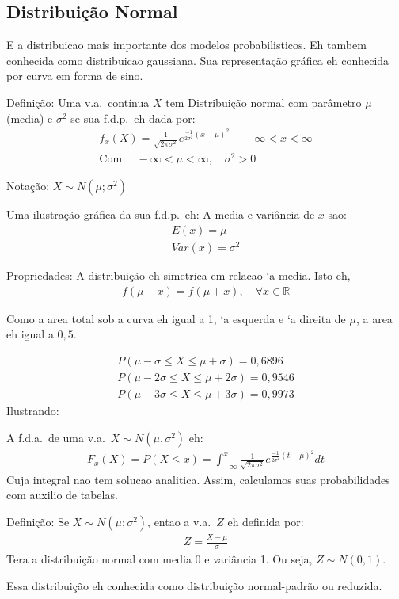 \subsection{Distribuição Normal}
E a distribuicao mais importante dos modelos probabilisticos. 
Eh tambem conhecida como distribuicao gaussiana. Sua representação 
gráfica eh conhecida por curva em forma de sino.
\begin{description}
  \item {Definição:}  Uma v.a.\ contínua $X$ tem Distribuição normal com parâmetro $\mu$ (media) e 
    $\sigma^2$ se sua f.d.p.\ eh dada por:
    \begin{align}
      f_{x} (X)= \frac{1}{\sqrt{2\pi \sigma^2}} e^{\frac{-1}{2\sigma^2} \left( x-\mu \right)^2} \quad -\infty<x<\infty \\
      \text{Com } \quad -\infty < \mu < \infty, \quad \sigma^2>0
    \end{align}
  \item {Notação:} $X \sim N(\mu ; \sigma^2)$

Uma ilustração gráfica da sua f.d.p.\ eh:
A media e variância de $x$ sao:
\begin{align*}
E(x) =\mu \\
Var(x)=\sigma^2
\end{align*}
\item {Propriedades:}
A distribuição eh simetrica em relacao `a media. Isto eh,
\begin{align}
  f(\mu - x) = f(\mu+x), \quad \forall x \in \mathbb{R}
\end{align}
\item Como a area total sob a curva eh igual a 1, `a esquerda e `a direita de $\mu$, 
  a area eh igual a $0,5$.
\item 
  \begin{align*}
    P(\mu -\sigma \leq X \leq \mu+\sigma)= 0,6896\\
    P(\mu -2\sigma \leq X \leq \mu+2\sigma)= 0,9546\\
    P(\mu -3\sigma \leq X \leq \mu+3\sigma)= 0,9973
  \end{align*}
Ilustrando:

A f.d.a.\ de uma v.a.\ $X \sim N(\mu,\sigma^2)$ eh:
\begin{align*}
  F_{x} (X)= P(X \leq x)= \int^{x}_{-\infty} \frac{1}{\sqrt{2\pi \sigma^2}}e^{\frac{-1}{2\sigma^2} \left( t- \mu \right)^2} dt 
\end{align*}
Cuja integral nao tem solucao analitica. Assim, calculamos suas probabilidades com auxilio de tabelas.

\item {Definição}: Se $X \sim N(\mu; \sigma^2)$, entao a v.a.\ $Z$ eh definida por:
  \begin{align}
   Z= \frac{X-\mu}{\sigma} 
  \end{align}
  Tera a distribuição normal com media 0 e variância 1. Ou seja, $Z \sim N(0,1)$.
  
  Essa distribuição eh conhecida como distribuição normal-padrão ou reduzida. 
\end{description}
